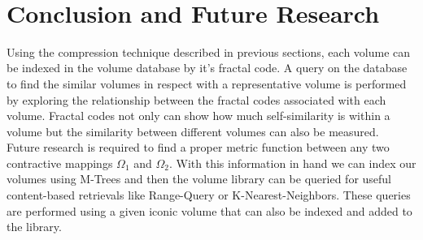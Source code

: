 \documentclass[10pt, conference, compsocconf]{IEEEtran}
\begin{document}
~\\
\section{Conclusion and Future Research}
Using the compression technique described in previous sections, each volume can be indexed in the volume database by it's fractal code. A query on the database to find the similar volumes in respect with a representative volume is performed by exploring the relationship between the fractal codes associated with each volume. Fractal codes not only can show how much self-similarity is within a volume but the similarity between different volumes can also be measured.~\\

Future research is required to find a proper metric function between any two contractive mappings $\Omega_1$ and $\Omega_2.$ With this information in hand we can index our volumes using M-Trees and then the volume library can be queried for useful content-based retrievals like Range-Query or K-Nearest-Neighbors. These queries are performed using a  given iconic volume that can also be indexed and added to the library.

\newpage


%
%
%
\end{document}
